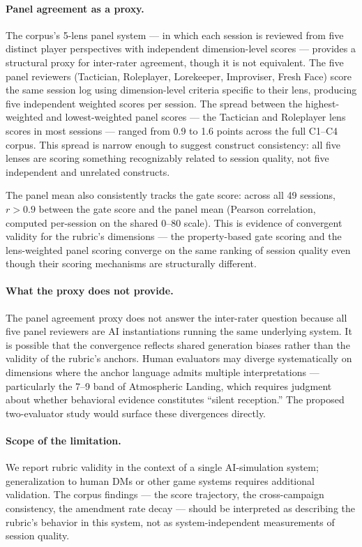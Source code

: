 \paragraph{Panel agreement as a proxy.}
The corpus's 5-lens panel system --- in which each session is reviewed from five
distinct player perspectives with independent dimension-level scores --- provides
a structural proxy for inter-rater agreement, though it is not equivalent. The five
panel reviewers (Tactician, Roleplayer, Lorekeeper, Improviser, Fresh Face) score
the same session log using dimension-level criteria specific to their lens, producing
five independent weighted scores per session. The spread between the highest-weighted
and lowest-weighted panel scores --- the Tactician and Roleplayer lens scores in most
sessions --- ranged from 0.9 to 1.6 points across the full C1--C4 corpus. This spread
is narrow enough to suggest construct consistency: all five lenses are scoring
something recognizably related to session quality, not five independent and unrelated
constructs.

The panel mean also consistently tracks the gate score: across all 49 sessions,
$r > 0.9$ between the gate score and the panel mean (Pearson correlation, computed
per-session on the shared 0--80 scale). This is evidence of convergent validity for
the rubric's dimensions --- the property-based gate scoring and the lens-weighted
panel scoring converge on the same ranking of session quality even though their
scoring mechanisms are structurally different.

\paragraph{What the proxy does not provide.}
The panel agreement proxy does not answer the inter-rater question because all five
panel reviewers are AI instantiations running the same underlying system. It is
possible that the convergence reflects shared generation biases rather than the
validity of the rubric's anchors. Human evaluators may diverge systematically on
dimensions where the anchor language admits multiple interpretations --- particularly
the 7--9 band of Atmospheric Landing, which requires judgment about whether behavioral
evidence constitutes ``silent reception.'' The proposed two-evaluator study would
surface these divergences directly.

\paragraph{Scope of the limitation.}
We report rubric validity in the context of a single AI-simulation system;
generalization to human DMs or other game systems requires additional validation.
The corpus findings --- the score trajectory, the cross-campaign consistency, the
amendment rate decay --- should be interpreted as describing the rubric's behavior
in this system, not as system-independent measurements of session quality.

